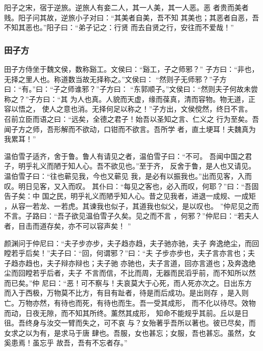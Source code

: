 \documentclass[]{article}
\begin{document}
阳子之宋，宿于逆旅。逆旅人有妾二人，其一人美，其一人恶。恶
者贵而美者贱。阳子问其故，逆旅小子对曰：``其美者自美，吾不知
其美也；其恶者自恶，吾不知其恶也。''阳子曰：``弟子记之：行贤
而去自贤之行，安往而不爱哉！''

\hypertarget{header-n2253}{%
\subsubsection{田子方}\label{header-n2253}}

田子方侍坐于魏文侯，数称谿工。文侯曰：``谿工，子之师邪？''
子方曰：``非也，无择之里人也。称道数当故无择称之。''文侯曰：
``然则子无师邪？''子方曰：``有。''曰：``子之师谁邪？''子方曰：
``东郭顺子。''文侯曰：``然则夫子何故未尝称之？''子方曰：``其
为人也真。人貌而天虚，缘而葆真，清而容物。物无道，正容以悟之，
使人之意也消。无择何足以称之！''子方出，文侯傥然，终日不言。
召前立臣而语之曰：``远矣，全德之君子！始吾以圣知之言、仁义之
行为至矣。吾闻子方之师，吾形解而不欲动，口钳而不欲言。吾所学
者，直土埂耳！夫魏真为我累耳！''

温伯雪子适齐，舍于鲁。鲁人有请见之者，温伯雪子曰：``不可。
吾闻中国之君子，明乎礼义而陋于知人心。吾不欲见也。''至于齐，
反舍于鲁，是人也又请见。温伯雪子曰：``往也蕲见我，今也又蕲见
我，是必有以振我也。''出而见客，入而叹。明日见客，又入而叹。
其仆曰：``每见之客也，必入而叹，何耶？''曰：``吾固告子矣：中
国之民，明乎礼义而陋乎知人心。昔之见我者，进退一成规、一成矩
，从容一若龙、一若虎。其谏我也似子，其道我也似父，是以叹也。
''仲尼见之而不言。子路曰：``吾子欲见温伯雪子久矣。见之而不言
，何邪？''仲尼曰：``若夫人者，目击而道存矣，亦不可以容声矣！ ''

颜渊问于仲尼曰：``夫子步亦步，夫子趋亦趋，夫子驰亦驰，夫子
奔逸绝尘，而回瞠若乎后矣！''夫子曰：``回，何谓邪？''曰：``夫
子步亦步也，夫子言亦言也；夫子趋亦趋也，夫子辩亦辩也；夫子驰
亦驰也，夫子言道，回亦言道也；及奔逸绝尘而回瞠若乎后者，夫子
不言而信，不比而周，无器而民滔乎前，而不知所以然而已矣。''仲
尼曰：``恶！可不察与！夫哀莫大于心死，而人死亦次之。日出东方
而入于西极，万物莫不比方，有目有趾者，待是而后成功。是出则存
，是入则亡。万物亦然，有待也而死，有待也而生。吾一受其成形，
而不化以待尽。效物而动，日夜无隙，而不知其所终。薰然其成形，
知命不能规乎其前。丘以是日徂。吾终身与汝交一臂而失之，可不哀
与？女殆著乎吾所以著也。彼已尽矣，而女求之以为有，是求马于唐
肆也。吾服，女也甚忘；女服，吾也甚忘。虽然，女奚患焉！虽忘乎
故吾，吾有不忘者存。''
\end{document}
